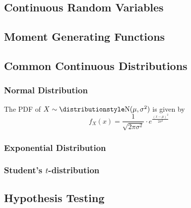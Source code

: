 \subsection{Continuous Random Variables}

\subsection{Moment Generating Functions}

\subsection{Common Continuous Distributions}

\subsubsection{Normal Distribution}


The PDF of \(X \sim \Normal(\mu, \sigma^2)\) is given by
\begin{equation*}
f_X(x) = \frac 1{\sqrt{2\pi\sigma^2}} \cdot
    e^{\frac{(x - \mu)^2}{2\sigma^2}}
\end{equation*}

\subsubsection{Exponential Distribution}

\subsubsection[Student's \texorpdfstring{\(t\)}{t}-distribution]
              {Student's \boldmath\(t\)-distribution}

\subsection{Hypothesis Testing}

